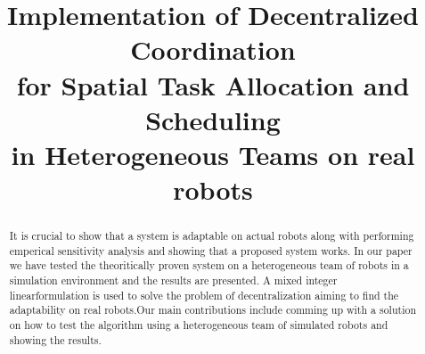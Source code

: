 \documentclass[conference]{IEEEtran}
\begin{document}
%
\title{Implementation of Decentralized Coordination\\ for Spatial Task Allocation
and Scheduling\\ in Heterogeneous Teams on real robots}


\author{
\and 
{}
}


% 
\maketitle

\begin{abstract}
It is crucial to show that a system is adaptable on actual robots along with performing emperical sensitivity analysis and showing that a proposed system works. In our paper we have tested the theoritically proven system on a heterogeneous team of robots in a simulation environment and the results are presented. A mixed integer linearformulation is used to solve the problem of decentralization aiming to find the adaptability on real robots.Our main contributions include comming up with a solution on how to test the algorithm using a heterogeneous team of simulated robots and showing the results.  
\end{abstract}
\end{document}
